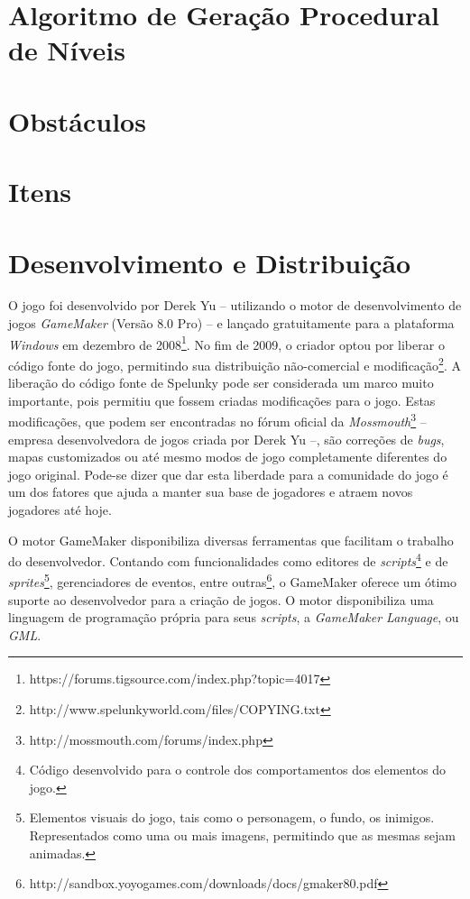 \section{\label{section:spelunky-procgen}Algoritmo de Geração Procedural de
Níveis}

\section{\label{section:spelunky-obstacles}Obstáculos}

\section{\label{section:spelunky-items}Itens}

\section{\label{section:spelunky-dev}Desenvolvimento e Distribuição}
O jogo foi desenvolvido por Derek Yu -- utilizando o motor de desenvolvimento de
jogos \textit{GameMaker} (Versão 8.0 Pro) -- e lançado gratuitamente para a
plataforma \textit{Windows} em dezembro de
2008\footnote{https://forums.tigsource.com/index.php?topic=4017}. No fim de
2009, o criador optou por liberar o código fonte do jogo, permitindo sua
distribuição não-comercial e
modificação\footnote{http://www.spelunkyworld.com/files/COPYING.txt}. A
liberação do código fonte de Spelunky pode ser considerada um marco muito
importante, pois permitiu que fossem criadas modificações para o jogo. Estas
modificações, que podem ser encontradas no fórum oficial da
\textit{Mossmouth}\footnote{http://mossmouth.com/forums/index.php} -- empresa
desenvolvedora de jogos criada por Derek Yu --, são correções de \textit{bugs},
mapas customizados ou até mesmo modos de jogo completamente diferentes do jogo
original. Pode-se dizer que dar esta liberdade para a comunidade do jogo é um
dos fatores que ajuda a manter sua base de jogadores e atraem novos jogadores
até hoje.

O motor GameMaker disponibiliza diversas ferramentas que facilitam o trabalho
do desenvolvedor. Contando com funcionalidades como editores de
\textit{scripts}\footnote{Código desenvolvido para o controle dos
comportamentos dos elementos do jogo.} e de \textit{sprites}\footnote{Elementos
visuais do jogo, tais como o personagem, o fundo, os inimigos. Representados
como uma ou mais imagens, permitindo que as mesmas sejam animadas.},
gerenciadores de eventos, entre
outras\footnote{http://sandbox.yoyogames.com/downloads/docs/gmaker80.pdf}, o
GameMaker oferece um ótimo suporte ao desenvolvedor para a criação de jogos. O
motor disponibiliza uma linguagem de programação própria para seus
\textit{scripts}, a \textit{GameMaker Language}, ou \textit{GML}.
